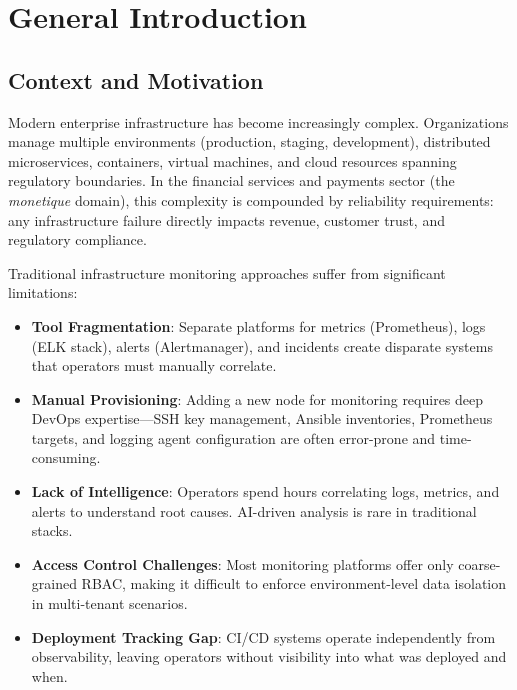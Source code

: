 \documentclass[12pt,a4paper]{report}
\begin{document}
\listoftables
{}
\newpage

\chapter*{General Introduction}

\section*{Context and Motivation}

Modern enterprise infrastructure has become increasingly complex. Organizations manage multiple environments (production, staging, development), distributed microservices, containers, virtual machines, and cloud resources spanning regulatory boundaries. In the financial services and payments sector (the \textit{monetique} domain), this complexity is compounded by reliability requirements: any infrastructure failure directly impacts revenue, customer trust, and regulatory compliance.

Traditional infrastructure monitoring approaches suffer from significant limitations:

\begin{itemize}
  \item \textbf{Tool Fragmentation}: Separate platforms for metrics (Prometheus), logs (ELK stack), alerts (Alertmanager), and incidents create disparate systems that operators must manually correlate.
  \item \textbf{Manual Provisioning}: Adding a new node for monitoring requires deep DevOps expertise—SSH key management, Ansible inventories, Prometheus targets, and logging agent configuration are often error-prone and time-consuming.
  \item \textbf{Lack of Intelligence}: Operators spend hours correlating logs, metrics, and alerts to understand root causes. AI-driven analysis is rare in traditional stacks.
  \item \textbf{Access Control Challenges}: Most monitoring platforms offer only coarse-grained RBAC, making it difficult to enforce environment-level data isolation in multi-tenant scenarios.
  \item \textbf{Deployment Tracking Gap}: CI/CD systems operate independently from observability, leaving operators without visibility into what was deployed and when.
\end{itemize}
\end{document}
